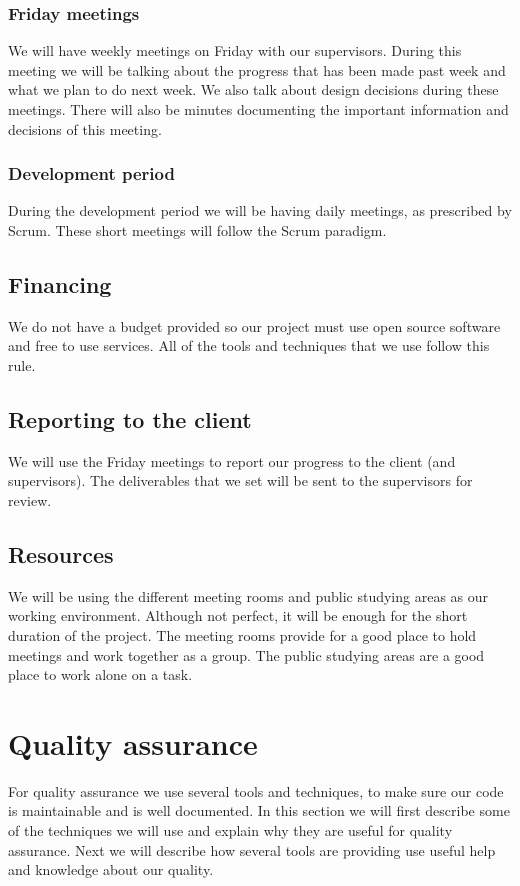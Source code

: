 \documentclass[]{article}
\begin{document}
\subsubsection{Friday meetings}
We will have weekly meetings on Friday with our supervisors.
During this meeting we will be talking about the progress that has been made past week and what we plan to do next week.
We also talk about design decisions during these meetings.
There will also be minutes documenting the important information and decisions of this meeting.
\subsubsection{Development period}
During the development period we will be having daily meetings, as prescribed by Scrum.
These short meetings will follow the Scrum paradigm.

\subsection{Financing}
We do not have a budget provided so our project must use open source software and free to use services.
All of the tools and techniques that we use follow this rule.

\subsection{Reporting to the client}
We will use the Friday meetings to report our progress to the client (and supervisors).
The deliverables that we set will be sent to the supervisors for review.

\subsection{Resources}
We will be using the different meeting rooms and public studying areas as our working environment.
Although not perfect, it will be enough for the short duration of the project.
The meeting rooms provide for a good place to hold meetings and work together as a group.
The public studying areas are a good place to work alone on a task.

\section{Quality assurance}
For quality assurance we use several tools and techniques, to make sure our code is maintainable and is well documented.
In this section we will first describe some of the techniques we will use and explain why they are useful for quality assurance.
Next we will describe how several tools are providing use useful help and knowledge about our quality.
\end{document}
